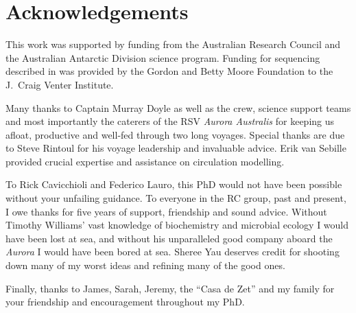 \chapter*{Acknowledgements} 

This work was supported by funding from the Australian Research Council and the Australian Antarctic Division science program.
Funding for sequencing described in  was provided by the Gordon and Betty Moore Foundation to the J.\ Craig Venter Institute.

Many thanks to Captain Murray Doyle as well as the crew, science support teams and most importantly the caterers of the RSV \textit{Aurora Australis} for keeping us afloat, productive and well-fed through two long voyages.
Special thanks are due to Steve Rintoul for his voyage leadership and invaluable advice.
Erik van Sebille provided crucial expertise and assistance on circulation modelling.

To Rick Cavicchioli and Federico Lauro, this PhD would not have been possible without your unfailing guidance.
To everyone in the RC group, past and present, I owe thanks for five years of support, friendship and sound advice.
Without Timothy Williams' vast knowledge of biochemistry and microbial ecology I would have been lost at sea, and without his unparalleled good company aboard the \textit{Aurora} I would have been bored at sea.
Sheree Yau deserves credit for shooting down many of my worst ideas and refining many of the good ones.

Finally, thanks to James, Sarah, Jeremy, the ``Casa de Zet'' and my family for your friendship and encouragement throughout my PhD.
